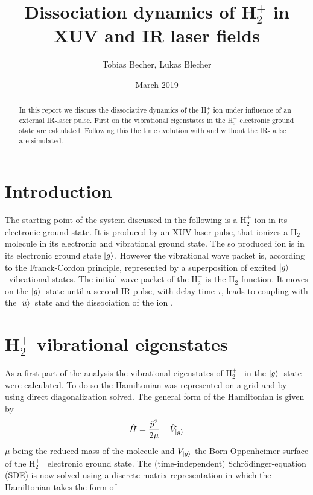 \documentclass[12pt]{article}
\title{Dissociation dynamics of H$_2^+$ in XUV and IR laser fields}
\author{Tobias Becher, Lukas Blecher}
\date{March 2019}
\newcommand{\hp}{H$_2^+$ }
\newcommand{\gr}{$\ket{g}$}
\newcommand{\us}{$\ket{u}$}
\begin{document}


\maketitle
\begin{abstract}
In this report we discuss the dissociative dynamics of the \hp ion under influence of an external IR-laser pulse. First on the vibrational eigenstates in the \hp electronic ground state are calculated. Following this the time evolution with and without the IR-pulse are simulated. 
\end{abstract}


\section{Introduction}
The starting point of the system discussed in the following is a \hp  ion in its electronic ground state. It is produced by an XUV laser pulse, that ionizes a H$_2$ molecule in its electronic and vibrational ground state. The so produced ion is in its electronic ground state \gr. However the vibrational wave packet is, according to the Franck-Cordon principle, represented by a superposition of excited \gr \ vibrational states. The initial wave packet of the \hp is the H$_2$ function. It moves on the \gr \ state until a second IR-pulse, with delay time $\tau$, leads to coupling with the \us \ state and the dissociation of the ion \cite{PhysRevA.93.012507,c107696046f943e78de27c893d23ac2f}.
\section{H$_2^+$ vibrational eigenstates}
As a first part of the analysis the vibrational eigenstates of \hp\ in the 
\gr\ state were calculated. To do so the Hamiltonian was represented on a grid and by using direct diagonalization solved.
The general form of the Hamiltonian is given by 
\begin{equation}\label{eqn:generalHamiltonian}
    \hat{H}=\frac{\hat{p}^2}{2\mu}+\hat{V}_{\ket{g}}
\end{equation}
$\mu$ being the reduced mass of the molecule and $V_{\ket{g}}$ the Born-Oppenheimer surface of the \hp\ electronic ground state.
The (time-independent) Schr\"odinger-equation (SDE) is now solved using a discrete matrix representation in which the Hamiltonian takes the form of
\end{document}
